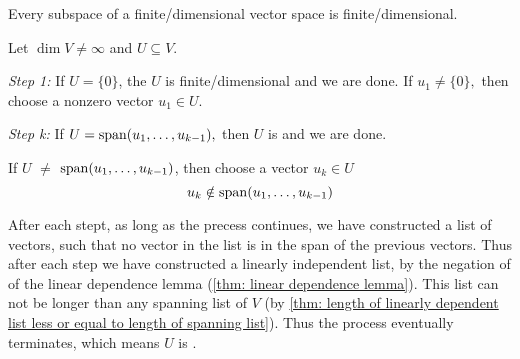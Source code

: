\setcounter{thm}{24}
\begin{thm} 
  \label{thm: finite-dimensional subspace}
  Every subspace of a finite\-/dimensional vector space is finite\-/dimensional.
\end{thm}
\begin{prf}
  Let $\dim V \neq \infty$ and $U \subseteq V$.

  \emph{Step 1:} If $U = \{0\}$, the $U$ is finite\-/dimensional and we are done. If $u_1 \neq \{0\},$ then choose a nonzero vector $u_1 \in U$.

  \emph{Step k:} If $ U = \operatorname{span} (u_1, \ldots, u_{k-1}),$ then $U$ is \fd and we are done.

  If $U$ $\neq$ $\operatorname{span} (u_1, \ldots, u_{k-1})$, then choose a vector $u_k \in U$ \st
  \begin{equation}
    u_k \notin \operatorname{span} (u_1, \ldots, u_{k-1})
  \end{equation}

  After each stept, as long as the precess continues, we have constructed a list of vectors, such that no vector in the list is in the span of the previous vectors. Thus after each step we have constructed a linearly independent list, by the negation of of the linear dependence lemma (\ref{thm: linear dependence lemma}).
  This list can not be longer than any spanning list of $V$ (by \ref{thm: length of linearly dependent list less or equal to length of spanning list}).
  Thus the process eventually terminates, which means $U$ is \fd.
\end{prf}